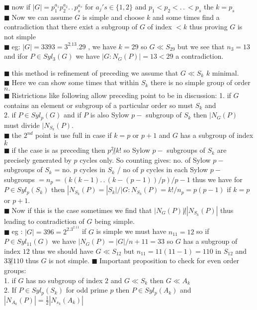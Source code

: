 \documentclass[11pt]{extarticle}
\newcommand{\ck}{.\,.\,}
\newcommand{\y}{$\blacksquare\;$}
\newcommand{\tbx}[2][]{
	\begin{tcolorbox}[enhanced,breakable,size=small,colback=black!2!white,title={#1},arc is angular, arc=1.5mm,drop fuzzy shadow]
		#2
	\end{tcolorbox}
}
\begin{document}
\begin{multicols}{2}
{\y now if $ |G|=p_1^{a_1}p_2^{a_2}\ck p_s^{a_s} $ for $ a_j's\in \{1,2\} $ and $ p_1<p_2<\ck<p_s $ the $ k=p_s $\\
\y Now we can assume $ G $ is simple and choose $ k $ and some times find a contradiction that there exist a subgroup of $ G $ of index $ <k $ thus proving $ G $ is not simple\\
\y eg: $ |G|=3393=3^2.13.29 $ , we have $ k=29 $ so $ G\ll S_{29} $ but we see that $ n_3=13 $ and ifor $ P\in Syl_3(G) $ we have $ |G:N_G(P)|=13 <29$ a contradiction. }
\tbx[3. Permutation representation ]{
\y this method is refinement of preceding we assume that $ G\ll S_k $ $ k $ minimal. \\
\y Here we can show some times that within $ S_k $ there is no simple group of order $ n .$ \\
\y Ristrictions like following allow preceding point to be in discussion:
1. if $ G $ contains an element or subgroup of a particular order so must $ S_k $ and\\
2. if $ P\in Syl_p(G) $ and if $ P $ is also Sylow $ p- $ subgroup of $ S_k $ then $ |N_G(P) $ must divide $ |N_{S_k}(P) $.\\
\y the $ 2^{nd} $ point is use full in case if $ k=p $ or $ p+1 $ and $ G $ has a subgroup of index $ k $\\
\y if the case is as preceding then $ p^2\not|k! $ so Sylow $ p- $ subgroups of $ S_k $ are precisely generated by $ p $ cycles only. So counting gives: no. of Sylow $ p- $ subgroups of $ S_k $ = no. $ p $ cycles in $ S_k $ / no of $ p $ cycles in each Sylow $ p- $ subgroups $ =n_p=(k(k-1)\ck (k-(p-1))/p)/p-1 $ thus we have for $ P\in Syl_p({S_k}) $ then $ |N_{S_k}(P) =|S_k|/|G:N_{S_k}(P)=k!/n_p=p(p-1)$ if $ k=p $ or $ p+1 .$ \\
\y Now if this is the case sometimes we find that $ |N_G(P)|\not| |N_{S_k}(P)| $ thus leading to contradiction of $ G$  being simple.\\
\y eg : $ |G|=396=2^2.3^2.11 $ if $ G $ is simple we must have $ n_11=12 $ so if $ P\in Syl_{11}(G) $ we have $ |N_G(P)=|G|/n+{11}=33 $ so $ G $ has a subgroup of index $ 12 $ thus we should have $ G\ll S_{12} $ but $ n_{11}=11(11-1)=110 $ in $ S_12 $ and $ 33\not|110 $ thus $ G $ is not simple. 
\y Important proposition to check for even order groups:\\
1. if $ G $ has no subgroup of index $ 2 $ and $ G\ll S_k $ then $ G\ll A_k $ \\
2. If $ P\in Syl_p(S_k) $ for odd prime $ p $ then $ P\in Syl_p(A_k) $ and $ |N_{A_k}(P)|=\frac{ 1 }{2} |N_{s_k}(A_k)| $ \\
}
\end{multicols}
\end{document}
